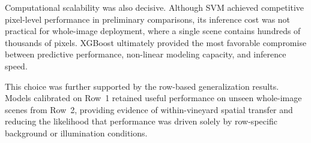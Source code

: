 \medskip\noindent
Computational scalability was also decisive. Although SVM achieved competitive pixel-level performance in preliminary comparisons, its inference cost was not practical for whole-image deployment, where a single scene contains hundreds of thousands of pixels. XGBoost ultimately provided the most favorable compromise between predictive performance, non-linear modeling capacity, and inference speed.

\medskip\noindent
This choice was further supported by the row-based generalization results. Models calibrated on Row~1 retained useful performance on unseen whole-image scenes from Row~2, providing evidence of within-vineyard spatial transfer and reducing the likelihood that performance was driven solely by row-specific background or illumination conditions.





